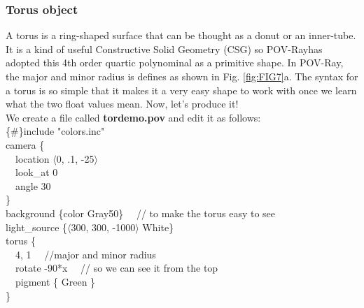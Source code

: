 \documentclass[fleqn,10pt]{wlscirep}
\newcommand*{\PV}{POV-Ray}
\begin{document}
\subsubsection{Torus object}
A torus is a ring-shaped surface that can be thought as a donut or an inner-tube. It is a kind of useful Constructive Solid Geometry (CSG) so \PV has adopted this 4th order quartic polynominal as a primitive shape. In \PV, the major and minor radius is defines as shown in Fig. \ref{fig:FIG7}a. The syntax for a torus is so simple that it makes it a very easy shape to work with once we learn what the two float values mean. Now, let's produce it!\\
\newline
We create a file called \textbf{tordemo.pov} and edit it as follows:\\
{\color{blue}
\{\#\}include "colors.inc"   \\
camera \{   \\
\ \ location $\langle$0, .1, -25$\rangle$   \\
\ \ look\_at 0   \\
\ \ angle 30    \\
\}   \\
background \{color Gray50\} \ \ // to make the torus easy to see   \\
light\_source \{$\langle$300, 300, -1000$\rangle$ White\}   \\
torus \{   \\
\ \ 4, 1    \ \ //major and minor radius   \\
\ \ rotate -90*x \ \ // so we can see it from the top  \\
\ \ pigment \{ Green \} \\
\}  \\
}\\
\end{document}
